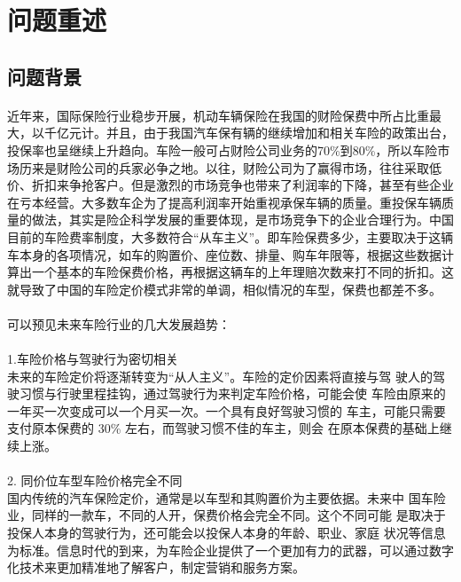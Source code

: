 \documentclass[a4paper]{article}
\title{}
\date{} %
\begin{document}
	
\tableofcontents %
\newpage

	\section{问题重述} 
		\subsection{问题背景} 
			\paragraph{}近年来，国际保险行业稳步开展，机动车辆保险在我国的财险保费中所占比重最大，以千亿元计。并且，由于我国汽车保有辆的继续增加和相关车险的政策出台，投保率也呈继续上升趋向。车险一般可占财险公司业务的70\%到80\%，所以车险市场历来是财险公司的兵家必争之地。以往，财险公司为了赢得市场，往往采取低价、折扣来争抢客户。但是激烈的市场竞争也带来了利润率的下降，甚至有些企业在亏本经营。大多数车企为了提高利润率开始重视承保车辆的质量。重投保车辆质量的做法，其实是险企科学发展的重要体现，是市场竞争下的企业合理行为。中国目前的车险费率制度，大多数符合“从车主义”。即车险保费多少，主要取决于这辆车本身的各项情况，如车的购置价、座位数、排量、购车年限等，根据这些数据计算出一个基本的车险保费价格，再根据这辆车的上年理赔次数来打不同的折扣。这就导致了中国的车险定价模式非常的单调，相似情况的车型，保费也都差不多。
			
			\paragraph{}可以预见未来车险行业的几大发展趋势：
			\paragraph{}1.车险价格与驾驶行为密切相关 \\
			\indent 未来的车险定价将逐渐转变为“从人主义”。车险的定价因素将直接与驾
			驶人的驾驶习惯与行驶里程挂钩，通过驾驶行为来判定车险价格，可能会使
			车险由原来的一年买一次变成可以一个月买一次。一个具有良好驾驶习惯的
			车主，可能只需要支付原本保费的 30\% 左右，而驾驶习惯不佳的车主，则会
			在原本保费的基础上继续上涨。	
			\paragraph{}2. 同价位车型车险价格完全不同 \\
			\indent 国内传统的汽车保险定价，通常是以车型和其购置价为主要依据。未来中
			国车险业，同样的一款车，不同的人开，保费价格会完全不同。这个不同可能
			是取决于投保人本身的驾驶行为，还可能会以投保人本身的年龄、职业、家庭
			状况等信息为标准。信息时代的到来，为车险企业提供了一个更加有力的武器，可以通过数字
			化技术来更加精准地了解客户，制定营销和服务方案。
				
\end{document}
